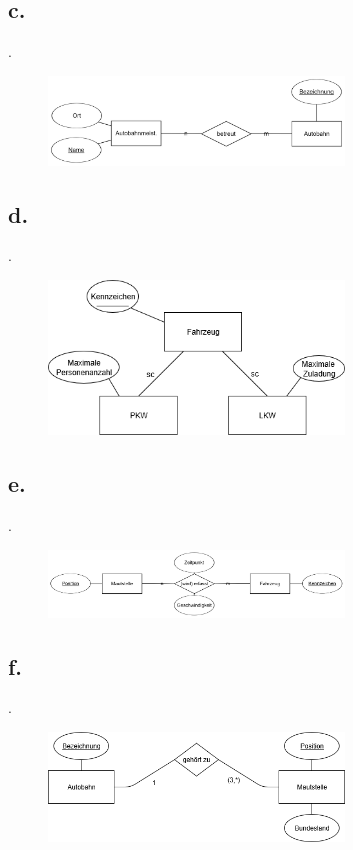 \documentclass{article}
\begin{document}
	\subsection*{c.}
	.
	\begin{figure}[h]
		\includegraphics[width=0.7\textwidth]{aufgabe_1_2_c.png}
	\end{figure}
	
	
	\newpage
	\subsection*{d.}
	.
	\begin{figure}[h]
		\includegraphics[width=0.7\textwidth]{aufgabe_1_2_d.png}
	\end{figure}
	
	\subsection*{e.}
	.
	\begin{figure}[h]
		\includegraphics[width=0.7\textwidth]{aufgabe_1_2_e.png}
	\end{figure}
	
	\subsection*{f.}
	.
	\begin{figure}[h]
		\includegraphics[width=0.7\textwidth]{aufgabe_1_2_f.png}
	\end{figure}
	
\end{document}
